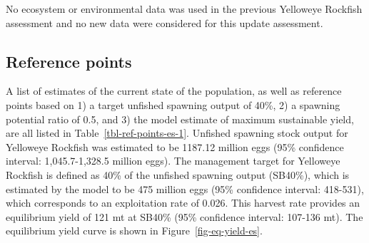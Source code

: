 \documentclass[
]{scrartcl}
\begin{document}
No ecosystem or environmental data was used in the previous Yelloweye
Rockfish assessment and no new data were considered for this update
assessment.

\subsection*{Reference points}\label{reference-points}

A list of estimates of the current state of the population, as well as
reference points based on 1) a target unfished spawning output of 40\%,
2) a spawning potential ratio of 0.5, and 3) the model estimate of
maximum sustainable yield, are all listed in
Table~\ref{tbl-ref-points-es-1}. Unfished spawning stock output for
Yelloweye Rockfish was estimated to be 1187.12 million eggs (95\%
confidence interval: 1,045.7-1,328.5 million eggs). The management
target for Yelloweye Rockfish is defined as 40\% of the unfished
spawning output (SB40\%), which is estimated by the model to be 475
million eggs (95\% confidence interval: 418-531), which corresponds to
an exploitation rate of 0.026. This harvest rate provides an equilibrium
yield of 121 mt at SB40\% (95\% confidence interval: 107-136 mt). The
equilibrium yield curve is shown in Figure~\ref{fig-eq-yield-es}.

\clearpage

\begingroup
\fontsize{9.0pt}{10.8pt}\selectfont
\end{document}

